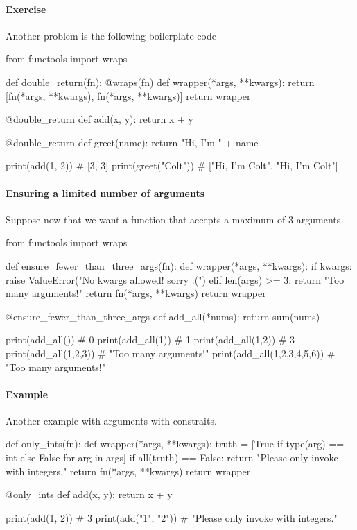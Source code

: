 \paragraph{Exercise} Another problem is the following boilerplate code 
\begin{listing}{1}
from functools import wraps 

def double_return(fn):
    @wraps(fn)
    def wrapper(*args, **kwargs):
        return [fn(*args, **kwargs), fn(*args, **kwargs)]
    return wrapper

@double_return 
def add(x, y):
    return x + y
    
@double_return
def greet(name):
    return "Hi, I'm " + name

print(add(1, 2)) # [3, 3]
print(greet("Colt")) # ["Hi, I'm Colt", "Hi, I'm Colt"]    
\end{listing}

\paragraph{Ensuring a limited number of arguments} Suppose now that we want a function that accepts a maximum of \(3\) arguments.
\begin{listing}{1}
from functools import wraps

def ensure_fewer_than_three_args(fn):
    def wrapper(*args, **kwargs):
        if kwargs:
            raise ValueError("No kwargs allowed! sorry :(")
        elif len(args) >= 3:
            return "Too many arguments!"
        return fn(*args, **kwargs)
    return wrapper

@ensure_fewer_than_three_args
def add_all(*nums):
    return sum(nums)

print(add_all()) # 0
print(add_all(1)) # 1
print(add_all(1,2)) # 3
print(add_all(1,2,3)) # "Too many arguments!"
print(add_all(1,2,3,4,5,6)) # "Too many arguments!"    
\end{listing}

\paragraph{Example} Another example with arguments with constraits.
\begin{listing}{1}
def only_ints(fn):
    def wrapper(*args, **kwargs):
        truth = [True if type(arg) == int else False for arg in args]
        if all(truth) == False:
            return "Please only invoke with integers."
        return fn(*args, **kwargs)
    return wrapper


@only_ints 
def add(x, y):
    return x + y
    
print(add(1, 2)) # 3
print(add("1", "2")) # "Please only invoke with integers."    
\end{listing}

